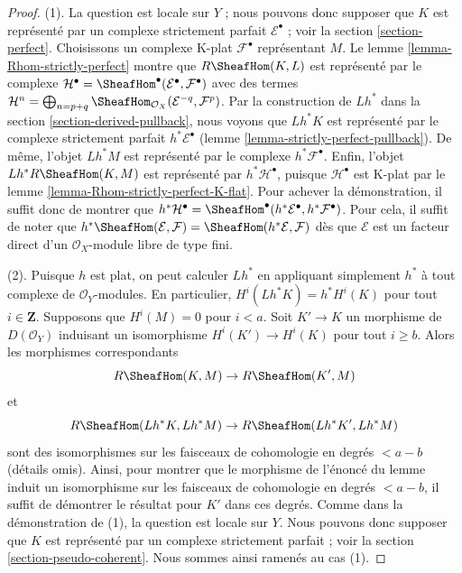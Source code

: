 {\begin{proof}
(1). La question est locale sur $Y$ ; nous pouvons donc supposer que
$K$ est représenté par un complexe strictement parfait
$\mathcal{E}^\bullet$ ; voir la section \ref{section-perfect}. Choisissons un complexe K-plat $\mathcal{F}^\bullet$ représentant $M$. Le lemme \ref{lemma-Rhom-strictly-perfect} montre que
$R\SheafHom(K, L)$ est représenté par le complexe
$\mathcal{H}^\bullet =
\SheafHom^\bullet(\mathcal{E}^\bullet, \mathcal{F}^\bullet)$
avec des termes $\mathcal{H}^n = \bigoplus\nolimits_{n = p + q}
\SheafHom_{\mathcal{O}_X}(\mathcal{E}^{-q}, \mathcal{F}^p)$. Par la construction de $Lh^*$ dans la section \ref{section-derived-pullback},
nous voyons que $Lh^*K$ est représenté par le complexe strictement parfait
$h^*\mathcal{E}^\bullet$ (lemme \ref{lemma-strictly-perfect-pullback}). De même, l'objet $Lh^*M$ est représenté par le complexe $h^*\mathcal{F}^\bullet$. Enfin, l'objet $Lh^*R\SheafHom(K, M)$
est représenté par $h^*\mathcal{H}^\bullet$, puisque
$\mathcal{H}^\bullet$ est K-plat par le lemme \ref{lemma-Rhom-strictly-perfect-K-flat}. Pour achever la démonstration, il suffit donc de montrer que
$h^*\mathcal{H}^\bullet =
\SheafHom^\bullet(h^*\mathcal{E}^\bullet, h^*\mathcal{F}^\bullet)$. Pour cela, il suffit de noter que
$h^*\SheafHom(\mathcal{E}, \mathcal{F}) =
\SheafHom(h^*\mathcal{E}, \mathcal{F})$
dès que $\mathcal{E}$ est un facteur direct d'un
$\mathcal{O}_X$-module libre de type fini.

\medskip\noindent

(2). Puisque $h$ est plat, on peut calculer $Lh^*$
en appliquant simplement $h^*$ à tout complexe de $\mathcal{O}_Y$-modules. En particulier, $H^i(Lh^*K) = h^*H^i(K)$ pour tout $i \in \mathbf{Z}$. Supposons que $H^i(M) = 0$ pour $i < a$. Soit $K' \to K$ un morphisme de $D(\mathcal{O}_Y)$ induisant un isomorphisme
$H^i(K') \to H^i(K)$ pour tout $i \geq b$. Alors les morphismes correspondants
$$
R\SheafHom(K, M) \to R\SheafHom(K', M)
$$
et
$$
R\SheafHom(Lh^*K, Lh^*M) \to R\SheafHom(Lh^*K', Lh^*M)
$$
sont des isomorphismes sur les faisceaux de cohomologie en degrés $< a - b$ (détails omis). Ainsi, pour montrer que le morphisme de l'énoncé du lemme induit un isomorphisme sur les faisceaux de cohomologie en degrés $< a - b$, il suffit de démontrer le résultat pour $K'$ dans ces degrés. Comme dans la démonstration de (1), la question est locale sur $Y$. Nous pouvons donc supposer que $K$ est représenté par un complexe strictement parfait ; voir la section \ref{section-pseudo-coherent}. Nous sommes ainsi ramenés au cas (1).

\medskip\noindent


\end{proof}}
